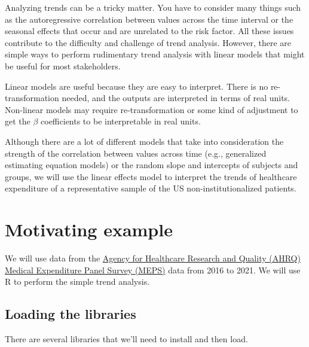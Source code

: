 \documentclass[
]{book}
\begin{document}
Analyzing trends can be a tricky matter. You have to consider many things such as the autoregressive correlation between values across the time interval or the seasonal effects that occur and are unrelated to the risk factor. All these issues contribute to the difficulty and challenge of trend analysis. However, there are simple ways to perform rudimentary trend analysis with linear models that might be useful for most stakeholders.

Linear models are useful because they are easy to interpret. There is no re-transformation needed, and the outputs are interpreted in terms of real units. Non-linear models may require re-transformation or some kind of adjustment to get the \(\beta\) coefficients to be interpretable in real units.

Although there are a lot of different models that take into consideration the strength of the correlation between values across time (e.g., generalized estimating equation models) or the random slope and intercepts of subjects and groups, we will use the linear effects model to interpret the trends of healthcare expenditure of a representative sample of the US non-institutionalized patients.

\hypertarget{motivating-example}{%
\section{Motivating example}\label{motivating-example}}

We will use data from the \href{https://meps.ahrq.gov/mepsweb/}{Agency for Healthcare Research and Quality (AHRQ) Medical Expenditure Panel Survey (MEPS)} data from 2016 to 2021. We will use R to perform the simple trend analysis.

\hypertarget{loading-the-libraries}{%
\subsection{Loading the libraries}\label{loading-the-libraries}}

There are several libraries that we'll need to install and then load.
\end{document}
